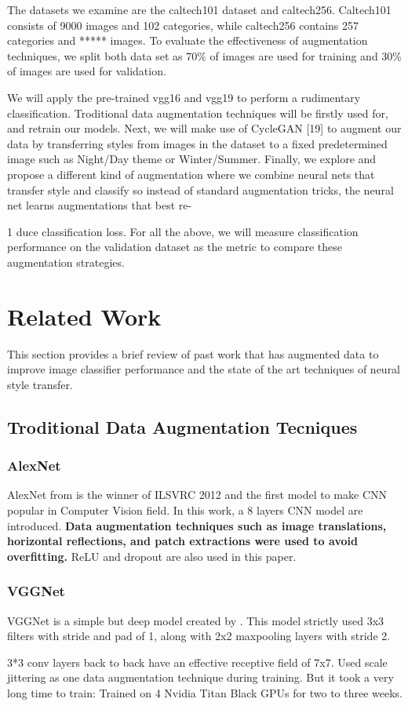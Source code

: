 \documentclass[a4paper,11pt]{article}
\begin{document}
The datasets we examine are the caltech101 dataset and caltech256. Caltech101 consists of 9000 images and 102 categories, while caltech256 contains 257 categories and ***** images. To evaluate the effectiveness of augmentation techniques, we split both data set as 70\% of images are used for training and 30\% of images are used for validation.

We will apply the pre-trained vgg16 and vgg19 to perform a rudimentary classification. Troditional data augmentation techniques will be firstly used for, and retrain our models. Next, we will make use of CycleGAN [19] to augment our data by transferring styles from images in the dataset to a ﬁxed predetermined image such as Night/Day theme or Winter/Summer. Finally, we explore and propose a different kind of augmentation where we combine neural nets that transfer style and classify so instead of standard augmentation tricks, the neural net learns augmentations that best re-

1 duce classiﬁcation loss. For all the above, we will measure classiﬁcation performance on the validation dataset as the metric to compare these augmentation strategies.

\section{Related Work}
This section provides a brief review of past work that has augmented data to improve image classiﬁer performance and the state of the art techniques of neural style transfer.
\subsection{Troditional Data Augmentation Tecniques}
\subsubsection{AlexNet}
AlexNet from \cite{krizhevsky2012imagenet} is the winner of ILSVRC 2012 and the first model to make CNN popular in Computer Vision field. In this work, a 8 layers CNN model are introduced. \textbf{Data augmentation techniques such as image translations, horizontal reflections, and patch extractions were used to avoid overfitting.} ReLU and dropout are also used in this paper.
\subsubsection{VGGNet}
VGGNet is a simple but deep model created by \cite{simonyan2014very}. This model strictly used 3x3 filters with stride and pad of 1, along with 2x2 maxpooling layers with stride 2.
\begin{outline}
 3*3 conv layers back to back have an effective receptive field of 7x7.
\1 Used scale jittering as one data augmentation technique during training.
\1 But it took a very long time to train: Trained on 4 Nvidia Titan Black GPUs for two to three weeks.
\end{outline}
\end{document}
